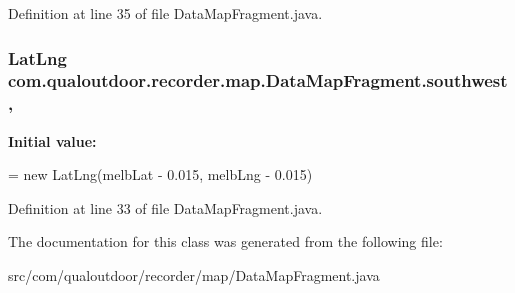 Definition at line 35 of file Data\-Map\-Fragment.\-java.

\hypertarget{classcom_1_1qualoutdoor_1_1recorder_1_1map_1_1DataMapFragment_a3b6230c23fec1713a516ddafdde9a00d}{
\subsubsection[{southwest}]{\setlength{\rightskip}{0pt plus 5cm}Lat\-Lng com.\-qualoutdoor.\-recorder.\-map.\-Data\-Map\-Fragment.\-southwest\hspace{0.3cm}{\ttfamily [static]}, {\ttfamily [private]}}}\label{classcom_1_1qualoutdoor_1_1recorder_1_1map_1_1DataMapFragment_a3b6230c23fec1713a516ddafdde9a00d}
{\bfseries Initial value\-:}
\begin{DoxyCode}
= \textcolor{keyword}{new} LatLng(melbLat - 0.015,
            melbLng - 0.015)
\end{DoxyCode}


Definition at line 33 of file Data\-Map\-Fragment.\-java.



The documentation for this class was generated from the following file\-:\begin{DoxyCompactItemize}
\item 
src/com/qualoutdoor/recorder/map/Data\-Map\-Fragment.\-java\end{DoxyCompactItemize}
